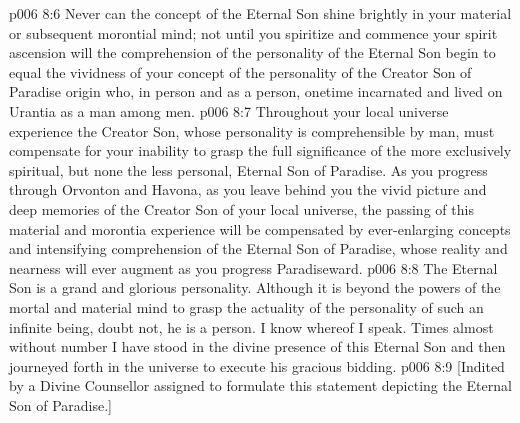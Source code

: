 \vs p006 8:6 Never can the concept of the Eternal Son shine brightly in your material or subsequent morontial mind; not until you spiritize and commence your spirit ascension will the comprehension of the personality of the Eternal Son begin to equal the vividness of your concept of the personality of the Creator Son of Paradise origin who, in person and as a person, onetime incarnated and lived on Urantia as a man among men.
\vs p006 8:7 Throughout your local universe experience the Creator Son, whose personality is comprehensible by man, must compensate for your inability to grasp the full significance of the more exclusively spiritual, but none the less personal, Eternal Son of Paradise. As you progress through Orvonton and Havona, as you leave behind you the vivid picture and deep memories of the Creator Son of your local universe, the passing of this material and morontia experience will be compensated by ever\hyp{}enlarging concepts and intensifying comprehension of the Eternal Son of Paradise, whose reality and nearness will ever augment as you progress Paradiseward.
\vs p006 8:8 \pc The Eternal Son is a grand and glorious personality. Although it is beyond the powers of the mortal and material mind to grasp the actuality of the personality of such an infinite being, doubt not, he is a person. I know whereof I speak. Times almost without number I have stood in the divine presence of this Eternal Son and then journeyed forth in the universe to execute his gracious bidding.
\vsetoff
\vs p006 8:9 [Indited by a Divine Counsellor assigned to formulate this statement depicting the Eternal Son of Paradise.]
